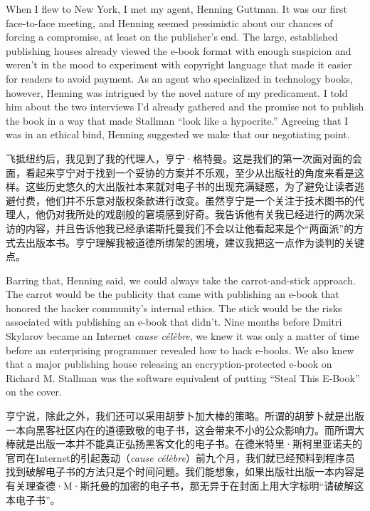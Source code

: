 \ifdefined\eng
When I flew to New York, I met my agent, Henning Guttman. It was our first face-to-face meeting, and Henning seemed pessimistic about our chances of forcing a compromise, at least on the publisher's end. The large, established publishing houses already viewed the e-book format with enough suspicion and weren't in the mood to experiment with copyright language that made it easier for readers to avoid payment. As an agent who specialized in technology books, however, Henning was intrigued by the novel nature of my predicament. I told him about the two interviews I'd already gathered and the promise not to publish the book in a way that made Stallman ``look like a hypocrite.'' Agreeing that I was in an ethical bind, Henning suggested we make that our negotiating point.
\fi

\ifdefined\chs
飞抵纽约后，我见到了我的代理人，亨宁·格特曼。这是我们的第一次面对面的会面，看起来亨宁对于找到一个妥协的方案并不乐观，至少从出版社的角度来看是这样。这些历史悠久的大出版社本来就对电子书的出现充满疑惑，为了避免让读者逃避付费，他们并不乐意对版权条款进行改变。虽然亨宁是一个关注于技术图书的代理人，他仍对我所处的戏剧般的窘境感到好奇。我告诉他有关我已经进行的两次采访的内容，并且告诉他我已经承诺斯托曼我们不会以让他看起来是个``两面派''的方式去出版本书。亨宁理解我被道德所绑架的困境，建议我把这一点作为谈判的关键点。
\fi

\ifdefined\eng
Barring that, Henning said, we could always take the carrot-and-stick approach. The carrot would be the publicity that came with publishing an e-book that honored the hacker community's internal ethics. The stick would be the risks associated with publishing an e-book that didn't. Nine months before Dmitri Skylarov became an Internet \textit{cause célèbre}, we knew it was only a matter of time before an enterprising programmer revealed how to hack e-books. We also knew that a major publishing house releasing an encryption-protected e-book on Richard M. Stallman was the software equivalent of putting ``Steal This E-Book'' on the cover.
\fi

\ifdefined\chs
亨宁说，除此之外，我们还可以采用胡萝卜加大棒的策略。所谓的胡萝卜就是出版一本向黑客社区内在的道德致敬的电子书，这会带来不小的公众影响力。而所谓大棒就是出版一本并不能真正弘扬黑客文化的电子书。在德米特里·斯柯里亚诺夫的官司在Internet的引起轰动（\textit{cause célèbre}）前九个月，我们就已经预料到程序员找到破解电子书的方法只是个时间问题。我们能想象，如果出版社出版一本内容是有关理查德·M·斯托曼的加密的电子书，那无异于在封面上用大字标明``请破解这本电子书''。
\fi

